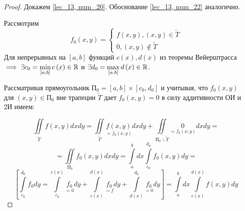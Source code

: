 \documentclass[../../main.tex]{subfiles}
\begin{document}
\begin{proof}
	Докажем \eqref {lec_13, num_20}. Обоснование \eqref {lec_13, num_22}
	аналогично.
	
	Рассмотрим 
	\[ 
	f_0 \left( x, y \right) =  
	\begin{cases}
	f \left( x, y \right),  \left( x, y \right) \in \widetilde{T} \\
	0, \left( x, y \right) \notin \widetilde{T}
	\end{cases}
	\]
	Для непрерывных на $ \left[ a, b \right] $ функций 
	$ c \left( x \right), d \left( x \right) $ из теоремы Вейерштрасса
	$ \implies \exists c_0 = \min\limits_{\left[ a, b \right] } c \left( x \right) \in \mathbb{R} $ и 
	$ \exists d_0 = \max\limits_{\left[ a, b \right] } d \left( x \right) \in \mathbb{R} $.
	
	Рассматривая прямоугольник $ \text{П}_0 = \left[ a, b \right] \times 
	\left[ c_0, d_0 \right]  $ и учитывая, что $ f_0 \left( x, y \right) $ для 
	$ \left( x, y \right) \in \text{П}_0 $ вне трапеции $\widetilde{T}$ дает
	$ f_0 \left( x, y \right) = 0 $ в силу аддитивности ОИ и 2И имеем:
	
	\[
	\iint\limits_{ \widetilde{T} } f \left( x, y \right) dx dy = 
	\iint\limits_{ \widetilde{T} } \underset{ = f_0 \left( x, y \right) } 
	{f \left( x, y \right)} dx dy + \iint\limits_{ \text{П}_0 \smallsetminus \widetilde{T} } 
	\underset{ = f_0 \left( x, y \right) }  0 dx dy =
	\]
	\[
	= \iint\limits_{ \text{П}_0} f_0 \left( x, y \right) dx dy = \int\limits_a^b dx
	\int\limits_{c_0}^{d_0} f_0 \left( x, y \right) dy = 
	\]
	\[
	\left[ \int\limits_{c_0}^{d_0} f_0 dy = \int\limits_{c_0} ^ {c \left( x \right) } 
	\underset{ = 0} {f_0} dy + \int\limits_{c \left( x \right) } ^ {d \left( x \right) } 
	\underset{ = f} {f_0} dy + \int\limits_{d \left( x \right) } ^ {d_0} 
	\underset{ = 0} {f_0} dy \right] = \int\limits_a^b dx \int\limits_{c \left( x \right) } ^
	{d \left( x \right) } f \left( x, y \right) dy
	\]
\end{proof}
\end{document}
